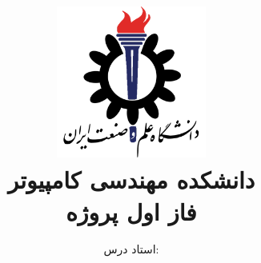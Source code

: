 \title{
    \center
    \includegraphics[width=5cm, height=5cm]{images/IUST_logo_color.png} \\
    دانشکده مهندسی کامپیوتر \\[25pt]     
فاز اول پروژه \\
\CourseName
}

\author{
    استاد درس:
    \Instructor \\[25pt]
}
\date{\Semester}
